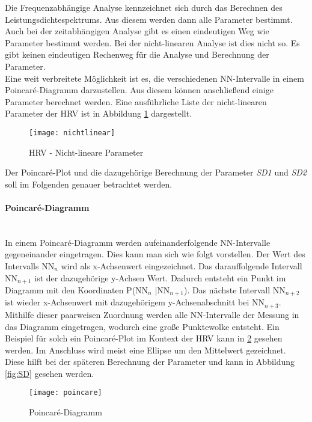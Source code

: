  Die Frequenzabhängige Analyse kennzeichnet sich durch das Berechnen des Leistungsdichtespektrums. Aus diesem werden dann alle Parameter bestimmt. Auch bei der zeitabhängigen Analyse gibt es einen eindeutigen Weg wie Parameter bestimmt werden. Bei der nicht-linearen Analyse ist dies nicht so. Es gibt keinen eindeutigen \glqq Rechenweg\grqq{} für die Analyse und Berechnung der Parameter. \\ 
 Eine  weit verbreitete Möglichkeit ist es, die verschiedenen NN-Intervalle in einem Poincaré-Diagramm darzustellen. Aus diesem können anschließend einige Parameter berechnet werden. Eine ausführliche Liste der nicht-linearen Parameter der HRV ist in Abbildung  \ref{fig:nichtlinear} dargestellt.\cite{poincare}
  \begin{figure}[H]
 	\centering
 	\texttt{[image: nichtlinear]}
 	\caption{HRV - Nicht-lineare Parameter}
 	\label{fig:nichtlinear}
 	\cite[S.3]{med}
 \end{figure}
 
 Der Poincaré-Plot und die dazugehörige Berechnung der Parameter \textit{SD1} und \textit{SD2} soll im Folgenden genauer betrachtet werden.
 
 \paragraph{Poincaré-Diagramm}\mbox{} \\
 In einem Poincaré-Diagramm werden aufeinanderfolgende NN-Intervalle gegeneinander eingetragen. Dies kann man sich wie folgt vorstellen.
 Der Wert des Intervalls NN$_{n}$  wird als x-Achsenwert eingezeichnet. Das darauffolgende Intervall NN$_{n+1}$ ist der dazugehörige y-Achsen Wert. Dadurch entsteht ein Punkt im Diagramm mit den Koordinaten P(NN$_{n}$ |NN$_{n+1}$). Das nächste Intervall NN$_{n+2}$ ist wieder x-Achsenwert mit dazugehörigem y-Achsenabschnitt bei NN$_{n+3}$. Mithilfe dieser paarweisen Zuordnung werden alle NN-Intervalle der Messung in das Diagramm eingetragen, wodurch eine große Punktewolke entsteht. Ein Beispiel für solch ein  Poincaré-Plot im Kontext der HRV kann in \ref{fig:poincare} gesehen werden. Im Anschluss wird meist eine Ellipse um den Mittelwert gezeichnet. Diese hilft bei der späteren Berechnung der Parameter und kann in Abbildung \ref{fig:SD} gesehen werden.\cite{poincare}

 \begin{figure}[H]
 	\centering
 	\texttt{[image: poincare]}
 	\caption{Poincaré-Diagramm}
 	\label{fig:poincare}
 	\cite{poincare}
 \end{figure}

